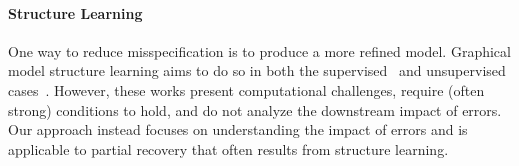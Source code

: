 \vspace{-0.5em}
\paragraph{Structure Learning}
One way to reduce misspecification is to produce a more refined model. Graphical model structure learning aims to do so in both the supervised~\citep{Ravikumar11, Loh13} and unsupervised cases~\citep{Chandrasekaran12,Meng14, bach2017learning, varma2019learning}. However, these works present computational challenges, require (often strong) conditions to hold, and do not analyze the downstream impact of errors. Our approach instead focuses on understanding the impact of errors and is applicable to partial recovery that often results from structure learning.




